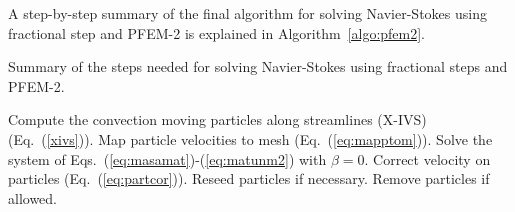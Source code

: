 A step-by-step summary of the final algorithm for solving Navier-Stokes using fractional step and PFEM-2 is explained in Algorithm~\ref{algo:pfem2}.
%
\begin{algorithm}[H]
\caption{Summary of the steps needed for solving Navier-Stokes using fractional steps and PFEM-2.}
\label{algo:pfem2}
\begin{algorithmic}[1]
\STATE Compute the convection moving particles along streamlines (X-IVS)(Eq.~(\ref{xivs})).
\STATE Map particle velocities to mesh (Eq.~(\ref{eq:mapptom})).
\STATE Solve the system of Eqs.~(\ref{eq:masamat})-(\ref{eq:matunm2}) with $\beta=0$.
\STATE Correct velocity on particles (Eq.~(\ref{eq:partcor})).
\STATE Reseed particles if necessary.
\STATE Remove particles if allowed.
\end{algorithmic}
\end{algorithm} 
%
